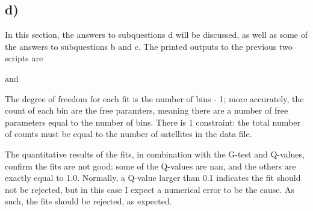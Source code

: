 \subsection*{d)}
In this section, the answers to subquestions d will be discussed, as well as some of the answers to subquestions b and c.
The printed outputs to the previous two scripts are

and


The degree of freedom for each fit is the number of bins - 1; more accurately, the count of each bin are the free paramters, meaning there are a number of free parameters equal to the number of bins. There is 1 constraint: the total number of counts must be equal to the number of satellites in the data file.

The quantitative results of the fits, in combination with the G-test and Q-values, confirm the fits are not good: some of the Q-values are nan, and the others are exactly equal to 1.0. Normally, a Q-value larger than 0.1 indicates the fit should not be rejected, but in this case I expect a numerical error to be the cause. As such, the fits should be rejected, as expected.
